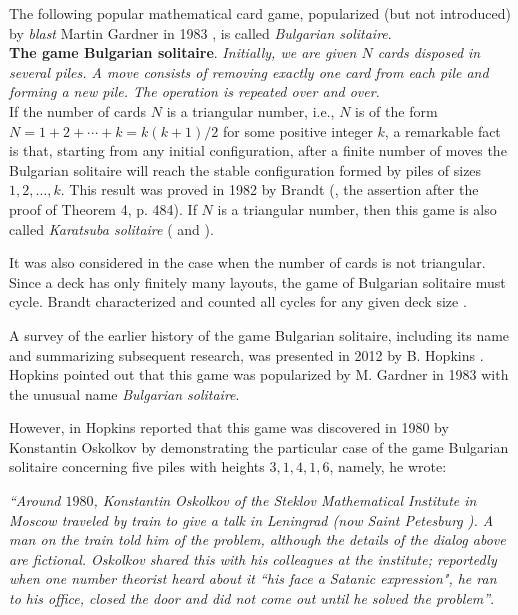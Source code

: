 \documentclass[oneside,12pt]{amsart}
\theoremstyle{definition}
\numberwithin{equation}{section}
\begin{document}
The following popular mathematical card game,
popularized (but not introduced) by {\it blast} Martin Gardner in 1983 
\cite{ga}, is called {\it Bulgarian solitaire}.\\


{\bf The game Bulgarian solitaire}. {\it Initially, we are given $N$ cards disposed in several piles. 
A move consists of removing exactly one card from each pile and forming a 
new pile. The operation is repeated over and over.}\\

If the number of cards $N$ is a triangular number, i.e., $N$ 
is of the form $N=1+2+\cdots +k=k(k+1)/2$
for some positive integer  $k$, a remarkable fact is that, starting from any initial
configuration, after a finite number of moves the Bulgarian solitaire
will reach the stable configuration formed by piles of sizes $1,2,\ldots, k$.
This result was proved in 1982 by  Brandt (\cite{br}, the assertion after the proof
of Theorem 4, p. 484). If $N$ is a triangular number, then this game 
is also called {\it Karatsuba solitaire} (\cite{hkk} and \cite{man}).


It was  also considered in \cite{br} the case when the
number of cards
is not triangular. Since a deck has only finitely many layouts, the game
of  Bulgarian solitaire must cycle.                                 
Brandt characterized and counted all cycles for any given
deck  size \cite[Theorem 5]{br}.  

A survey of the earlier history 
of the game Bulgarian solitaire, including its name and summarizing subsequent 
research, was  presented in 2012 by B. Hopkins \cite{ho}. 
Hopkins pointed out that this game was popularized by M. Gardner in 
1983 \cite{ga} with the unusual name {\it Bulgarian solitaire}. 


However,  in \cite{ho} Hopkins reported  that this game was  
discovered in 1980 by Konstantin Oskolkov by demonstrating the 
particular case of the game Bulgarian solitaire  concerning five piles with heights
$3,1,4,1,6$, namely, he wrote: 

{\it ``Around $1980$, Konstantin Oskolkov of the Steklov Mathematical Institute
in Moscow traveled by train to give a talk in Leningrad 
{\rm (now Saint Petesburg} {\rm )}. A man on the train told him
of the problem, although the details of the dialog above are fictional. 
Oskolkov shared this with his colleagues at the institute; reportedly
when one number theorist heard about it ``his face a Satanic expression",
he ran to his office, closed the door and did not come out until he 
solved the problem''}.  
 
\end{document}
